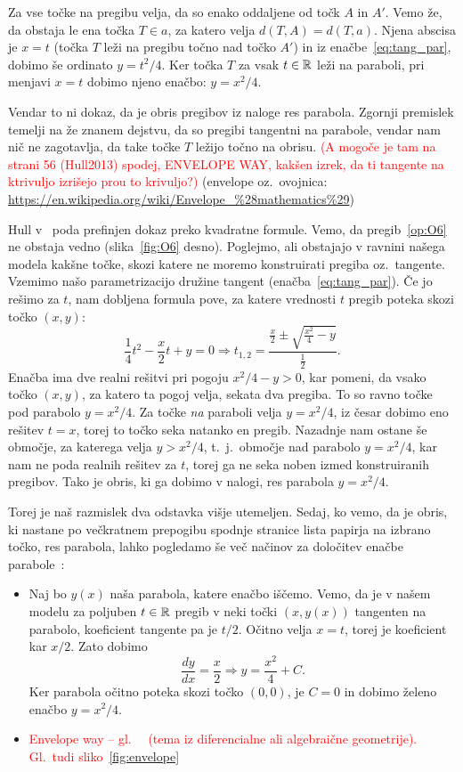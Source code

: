 Za vse točke na pregibu velja, da so enako oddaljene od točk $A$ in $A'$. Vemo že, da obstaja le ena točka $T \in a$, za katero velja $d(T, A) = d(T, a)$. Njena abscisa je $x = t$ (točka $T$ leži na pregibu točno nad točko $A'$) in iz enačbe~\ref{eq:tang_par}, dobimo še ordinato $y = t^2 / 4$. Ker točka $T$ za vsak $t \in \mathbb R$ leži na paraboli, pri menjavi $x = t$ dobimo njeno enačbo: $y = x^2 / 4$.

Vendar to ni dokaz, da je obris pregibov iz naloge res parabola. Zgornji premislek temelji na že znanem dejstvu, da so pregibi tangentni na parabole, vendar nam nič ne zagotavlja, da take točke $T$ ležijo točno na obrisu. \textcolor{red}{(A mogoče je tam na strani 56 (Hull2013) spodej, ENVELOPE WAY, kakšen izrek, da ti tangente na ktrivuljo izrišejo prou to krivuljo?)} (envelope oz.\ ovojnica: \url{https://en.wikipedia.org/wiki/Envelope_%28mathematics%29})

Hull v~\cite[str.\ 55--56]{hull2013} poda prefinjen dokaz preko kvadratne formule. Vemo, da pregib~\ref{op:O6} ne obstaja vedno (slika~\ref{fig:O6} desno). Poglejmo, ali obstajajo v ravnini našega modela kakšne točke, skozi katere ne moremo konstruirati pregiba oz.\ tangente. Vzemimo našo parametrizacijo družine tangent (enačba~\ref{eq:tang_par}). Če jo rešimo za $t$, nam dobljena formula pove, za katere vrednosti $t$ pregib poteka skozi točko $(x, y)$:
$$ \frac{1}{4}t^2 - \frac{x}{2}t + y = 0 \Rightarrow t_{1,2} = \frac{\frac{x}{2} \pm \sqrt{\frac{x^2}{4} - y}}{\frac{1}{2}}.$$
Enačba ima dve realni rešitvi pri pogoju $x^2 / 4 - y > 0$, kar pomeni, da vsako točko $(x, y)$, za katero ta pogoj velja, sekata dva pregiba. To so ravno točke pod parabolo $y = x^2 / 4$. Za točke \emph{na} paraboli velja $y = x^2 / 4$, iz česar dobimo eno rešitev $t = x$, torej to točko seka natanko en pregib. Nazadnje nam ostane še območje, za katerega velja $y > x^2 / 4$, t.\ j.\ območje nad parabolo $y = x^2 / 4$, kar nam ne poda realnih rešitev za $t$, torej ga ne seka noben izmed konstruiranih pregibov. Tako je obris, ki ga dobimo v nalogi, res parabola $y = x^2 / 4$.

Torej je naš razmislek dva odstavka višje utemeljen. Sedaj, ko vemo, da je obris, ki nastane po večkratnem prepogibu spodnje stranice lista papirja na izbrano točko, res parabola, lahko pogledamo še več načinov za določitev enačbe parabole~\cite[str.\ 55--56]{hull2013}:
\begin{itemize}
    \item Naj bo $y(x)$ naša parabola, katere enačbo iščemo. Vemo, da je v našem modelu za poljuben $t \in \mathbb R$ pregib v neki točki $(x, y(x))$ tangenten na parabolo, koeficient tangente pa je $t / 2$. Očitno velja $x = t$, torej je koeficient kar $x / 2$. Zato dobimo
    $$ \frac{dy}{dx} = \frac{x}{2} \Rightarrow y = \frac{x^2}{4} + C. $$
    Ker parabola očitno poteka skozi točko $(0, 0)$, je $C = 0$ in dobimo želeno enačbo $y = x^2 / 4$.
    \item \textcolor{red}{Envelope way -- gl.\ ~\cite[str.\ 56 spodaj]{hull2013} (tema iz diferencialne ali algebraične geometrije). Gl.\ tudi sliko~\ref{fig:envelope}}
\end{itemize}

